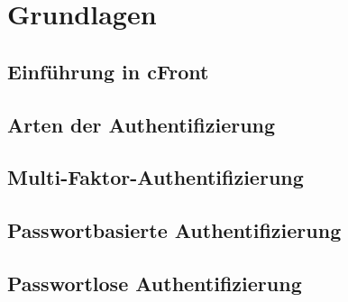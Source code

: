 \chapter{Grundlagen}

\section{Einführung in cFront}

\section{Arten der Authentifizierung}

\section{Multi-Faktor-Authentifizierung}

\section{Passwortbasierte Authentifizierung}

\section{Passwortlose Authentifizierung}